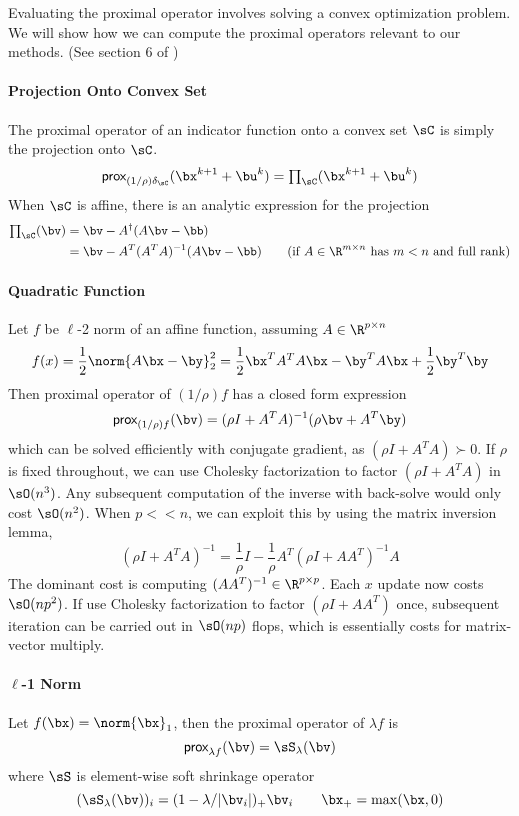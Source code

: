 \documentclass[../writeup.tex]{subfiles}
\begin{document}
Evaluating the proximal operator involves solving a convex optimization problem. We will show how we can compute the proximal operators relevant to our methods. (See section 6 of \cite{parikhProximalAlgorithms2014}) 

\paragraph{Projection Onto Convex Set} 
The proximal operator of an indicator function onto a convex set $\sC$ is simply the projection onto $\sC$. 
\[
    \prox_{(1/\rho)\delta_{\sC}}(\bx^{k+1} + \bu^k) =  \textstyle\prod_{\sC}(\bx^{k+1}+\bu^k)
\]
When $\sC$ is affine, there is an analytic expression for the projection
\begin{align*}
    \textstyle\prod_{\sC}(\bv) 
        &= \bv - A^{\dagger}(A\bv-\bb)  \\
        &= \bv - A^T(A^TA)^{-1}(A\bv-\bb) \tag{if $A\in\R^{m\times n}$ has $m<n$ and full rank}
\end{align*}

\paragraph{Quadratic Function}

Let $f$ be $\ell$-2 norm of an affine function, assuming $A\in\R^{p\times n}$
\[
    f(x) 
        = \frac{1}{2} \norm{A\bx-\by}_2^2 
        = \frac{1}{2}\bx^TA^TA\bx - \by^TA\bx + \frac{1}{2}\by^T\by
\]
Then proximal operator of $(1/\rho)f$ has a closed form expression
\[
    \prox_{(1/\rho)f}(\bv) 
        = (\rho I + A^TA)^{-1} (\rho \bv + A^T \by)
\]
which can be solved efficiently with conjugate gradient, as $(\rho I + A^TA) \succ 0$. If $\rho$ is fixed throughout, we can use Cholesky factorization to factor $(\rho I + A^TA)$ in $\sO(n^3)$. Any subsequent computation of the inverse with back-solve would only cost $\sO(n^2)$. When $p<<n$, we can exploit this by using the matrix inversion lemma, 
\[
    (\rho I + A^TA)^{-1} 
        = \frac{1}{\rho} I - \frac{1}{\rho} A^T \left( \rho I + AA^T \right)^{-1} A
\]
The dominant cost is computing $(AA^T)^{-1} \in \R^{p\times p}$. Each $x$ update now costs $\sO(np^2)$. If use Cholesky factorization to factor $(\rho I + AA^T)$ once, subsequent iteration can be carried out in $\sO(np)$ flops, which is essentially costs for matrix-vector multiply.

\paragraph{$\ell$-1 Norm} 
Let $f(\bx) = \norm{\bx}_1$, then the proximal operator of $\lambda f$ is
\[
    \prox_{\lambda f}(\bv) 
        = \sS_{\lambda}(\bv)
\]
where $\sS$ is element-wise soft shrinkage operator
\[
    (\sS_{\lambda}(\bv))_i
        = (1-\lambda/|\bv_i|)_{+}\bv_i
    \quad\quad
    \bx_{+} = \max(\bx,0)
\]
\end{document}
